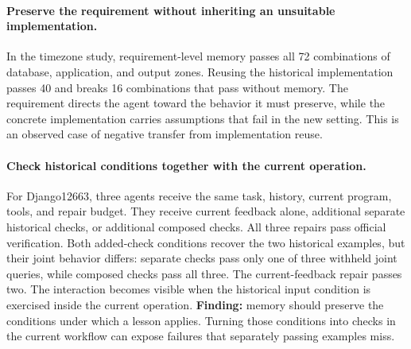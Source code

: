 \documentclass{article}
\begin{document}
\paragraph{Preserve the requirement without inheriting an unsuitable implementation.}
In the timezone study, requirement-level memory passes all 72 combinations
of database, application, and output zones. Reusing the historical
implementation passes 40 and breaks 16 combinations that pass without memory.
The requirement directs the agent toward the behavior it must preserve,
while the concrete implementation carries assumptions that fail in the new
setting. This is an observed case of negative transfer from implementation
reuse.

\paragraph{Check historical conditions together with the current operation.}
For Django12663, three agents receive the same task, history, current program,
tools, and repair budget. They receive current feedback alone, additional
separate historical checks, or additional composed checks. All three repairs
pass official verification. Both added-check conditions recover the two
historical examples, but their joint behavior differs: separate checks pass
only one of three withheld joint queries, while composed checks pass all three.
The current-feedback repair passes two. The interaction becomes visible when
the historical input condition is exercised inside the current operation.
\textbf{Finding:} memory should preserve the conditions under which a lesson
applies. Turning those conditions into checks in the current workflow can
expose failures that separately passing examples miss.
\end{document}

